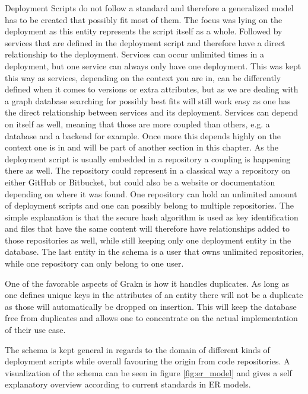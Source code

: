 Deployment Scripts do not follow a standard and therefore a generalized model has to be created that possibly fit most of them. The focus was lying on the deployment as this entity represents the script itself as a whole. Followed by services that are defined in the deployment script and therefore have a direct relationship to the deployment. Services can occur unlimited times in a deployment, but one service can always only have one deployment. This was kept this way as services, depending on the context you are in, can be differently defined when it comes to versions or extra attributes, but as we are dealing with a graph database searching for possibly best fits will still work easy as one has the direct relationship between services and its deployment.
Services can depend on itself as well, meaning that those are more coupled than others, e.g. a database and a backend for example. Once more this depends highly on the context one is in and will be part of another section in this chapter. 
As the deployment script is usually embedded in a repository a coupling is happening there as well. The repository could represent in a classical way a repository on either GitHub or Bitbucket, but could also be a website or documentation depending on where it was found. One repository can hold an unlimited amount of deployment scripts and one can possibly belong to multiple repositories. The simple explanation is that the secure hash algorithm is used as key identification and files that have the same content will therefore have relationships added to those repositories as well, while still keeping only one deployment entity in the database. The last entity in the schema is a user that owns unlimited repositories, while one repository can only belong to one user.

One of the favorable aspects of Grakn is how it handles duplicates. As long as one defines unique keys in the attributes of an entity there will not be a duplicate as those will automatically be dropped on insertion. This will keep the database free from duplicates and allows one to concentrate on the actual implementation of their use case.

The schema is kept general in regards to the domain of different kinds of deployment scripts while overall favouring the origin from code repositories. A visualization of the schema can be seen in figure \ref{fig:er_model} and gives a self explanatory overview according to current standards in ER models.

